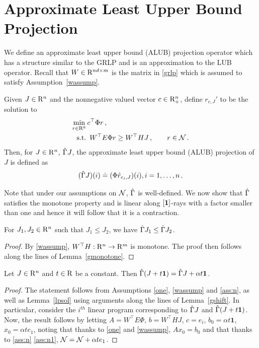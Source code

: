 \section{Approximate Least Upper Bound Projection}\label{sec:alubp}
We define an approximate least upper bound (ALUB) projection operator which has a structure similar to the GRLP and is an approximation to the LUB operator.
Recall that $W\in \mathrm{R}^{nd\times m}$ is the matrix in \eqref{grlp} which is assumed to satisfy Assumption~\ref{wassump}.
\begin{definition}\label{alubpop}
Given $J\in \mathrm{R}^n$ and the nonnegative valued vector $c\in \mathrm{R}^n_+$, define $r_{c,J}'$ to be the solution to 
\begin{align}\label{alubplp}
 \underset{r\in \R^k}{\min}& \,\mb c^\top \Phi r\,,\nn\\
 \text{s.t.}& \,\,\, W^\top E \Phi r\geq W^\top HJ\,,\qquad r \in \N\,.
\end{align}
Then, for $J\in \mathrm{R}^n$, $\hat{\Gamma} J$, the approximate least upper bound (ALUB) projection of $J$ is defined as 
\begin{align}\label{tgamdef}
(\hg J)(i)\eqdef(\Phi \har_{e_i,J})(i), \mb i=1,\ldots,n\,.
\end{align}
\end{definition}
\noindent 
Note that under our assumptions on $\mathcal{N}$, $\hat{\Gamma}$ is well-defined.
We now show that $\hat{\Gamma}$ satisfies the monotone property and is linear along $[\mathbf{1}]$-rays with a factor smaller than one and hence it will follow that it is a contraction.
\begin{lemma}\label{tgmonotone}
For $J_1, J_2\in \mathrm{R}^n$ such that $J_1\leq J_2$, we have $\hat{\Gamma} J_1\leq \hat{\Gamma} J_2$.
\end{lemma}
\begin{proof}
By \cref{wassump}, $W^\top H: \mathrm{R}^n \to \mathrm{R}^m$ is monotone.
The proof then follows along the lines of Lemma~\ref{gmonotone}.
\end{proof}
\begin{lemma}\label{tgshift}
Let $J\in \mathrm{R}^n$ and $t\in \mathrm{R}$ be a constant. Then $\hat{\Gamma} (J+t\mathbf{1})=\hat{\Gamma} J+\alpha t\mathbf{1}$.
\end{lemma}
\begin{proof}
The statement follows from Assumptions \ref{one}, \ref{wassump} and \ref{ass:n}, 
as well as Lemma~\ref{lpsol} using arguments along the lines of Lemma~\ref{gshift}. 
In particular, consider the $i^{th}$ linear program corresponding to $\hat{\Gamma} J$ and $\hat{\Gamma} (J+t\mathbf{1})$. 
Now, the result follows by letting $A=W^\top E \Phi$, $b=W^\top H J$, 
$c=e_i$, $b_0=\alpha t \mathbf{1}$, 
$x_0=\alpha t e_1$,
noting that thanks to
\cref{one} and \ref{wassump}, $A x_0 = b_0$ and that thanks to
\cref{ass:n} \eqref{ass:n1}, $\mathcal{N} = \mathcal{N} + \alpha t e_1$.
\end{proof}
